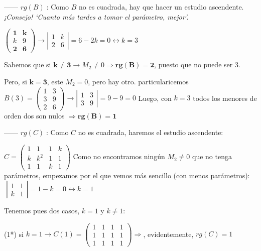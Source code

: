 \begin{proofw}
------ $rg(B)\; $: Como $B$ no es cuadrada, hay que hacer un estudio ascendente. \emph{¡Consejo! `Cuanto más tardes a tomar el parámetro, mejor'.}

$\left( \begin{matrix} \boldsymbol{1}&\boldsymbol{k}\\k&9\\\boldsymbol{2}&\boldsymbol{6}  \end{matrix} \right) \to \left| \begin{matrix} 1&k\\2&6 \end{matrix} \right|=6-2k=0 \leftrightarrow k=3$

Sabemos que si $\boldsymbol{k\neq 3} \to M_2\neq 0 \Rightarrow \boldsymbol{rg(B)=2}$, puesto que no puede ser $3$.

Pero, si $\boldsymbol{k=3}$, este $M_2=0$, pero hay otro. particularicemos $B(3)=\left( \begin{matrix} \boxed{1}&3\\3&9\\2&6 \end{matrix} \right) \to \left| \begin{matrix} \boxed{1}&3\\3&9 \end{matrix} \right|= 9-9=0$ Luego, con $k=3$ todos los menores de orden dos son nulos $\Rightarrow \boldsymbol{rg(B)=1}$

------ $rg(C)\; $: Como $C$ no es cuadrada, haremos el estudio ascendente:

$C=\left( \begin{matrix} 1&1&1&k\\k&k^2&\boxed{1}&\boxed{1}\\1&1&\boxed{k}&\boxed{1}  \end{matrix} \right)  $ Como no encontramos ningún $M_2\neq 0$ que no tenga parámetros, empezamos por el que vemos más sencillo (con menos parámetros): $\; \left| \begin{matrix} 1&1\\k&1 \end{matrix} \right|=1-k=0 \leftrightarrow k=1$

Tenemos pues dos casos, $k=1$ y $k\neq 1$:

(1*) si $k=1 \to C(1)=\left( \begin{matrix} 1&1&1&1\\1&1&1&1\\1&1&1&1 \end{matrix} \right) \Rightarrow $, evidentemente, $rg(C)=1$ 


\end{proofw}
